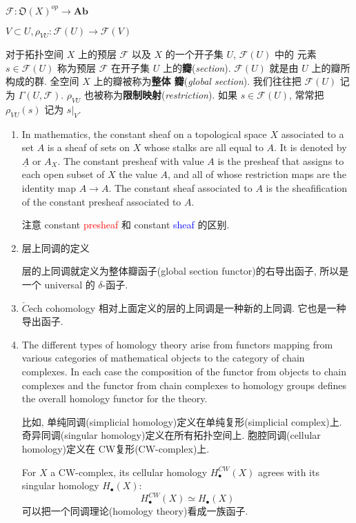 \documentclass{ctexart}
\newcommand{\F}{\mathscr{F}}
\newcommand{\NBR}[1]{\mathfrak{O}(#1)}
\begin{document}
$\F \colon \NBR{X}^{op} \to \mathbf{A\!b}$

$V \subset U, \rho_{VU} : \F(U) \to \F(V)$

对于拓扑空间 $X$ 上的预层 $\F$ 以及 $X$ 的一个开子集 $U$, $\F(U)$ 中的
元素 $s \in \F(U)$ 称为预层 $\F$ 在开子集 $U$ 上的\textbf{瓣}(\textit{section}). $\F(U)$
就是由 $U$ 上的瓣所构成的群. 全空间 $X$ 上的瓣被称为\textbf{整体
  瓣}(\textit{global section}). 我们往往把 $\F(U)$ 记为 $\Gamma(U,
\F)$. $\rho_{VU}$ 也被称为\textbf{限制映射}(\textit{restriction}). 如果 $s \in
\F(U)$, 常常把 $\rho_{VU}(s)$ 记为 $s|_{V}$.

\begin{enumerate}
\item In mathematics, the constant sheaf on a topological space $X$ associated to a set $A$ is a sheaf of sets on $X$ whose stalks are all equal to $A$. It is denoted by $\underline{A}$ or $A_X$. The constant presheaf with value $A$ is the presheaf that assigns to each open subset of $X$ the value $A$, and all of whose restriction maps are the identity map $A\to A$. The constant sheaf associated to $A$ is the sheafification of the constant presheaf associated to $A$.\cite{constant_sheaf}

    注意 constant \textcolor{red}{presheaf} 和 constant \textcolor{blue}{sheaf} 的区别.

\item 层上同调的定义

层的上同调就定义为整体瓣函子(global section functor)的右导出函子, 所以是一个 universal 的 $\delta$-函子.


\item $\check{C}$ech cohomology 相对上面定义的层的上同调是一种新的上同调. 它也是一种导出函子.

\item The different types of homology theory arise from functors mapping from various categories of mathematical objects to the category of chain complexes. In each case the composition of the functor from objects to chain complexes and the functor from chain complexes to homology groups defines the overall homology functor for the theory.

比如, 单纯同调(simplicial homology)定义在单纯复形(simplicial complex)上. 奇异同调(singular homology)定义在所有拓扑空间上. 胞腔同调(cellular homology)定义在 CW复形(CW-complex)上.

For $X$ a CW-complex, its cellular homology $H^{CW}_\bullet(X)$ agrees with its singular homology $H_\bullet(X)$:
\[
H^{CW}_\bullet(X)\simeq H_\bullet(X)
\]
可以把一个同调理论(homology theory)看成一族函子.


\end{enumerate}
\end{document}
